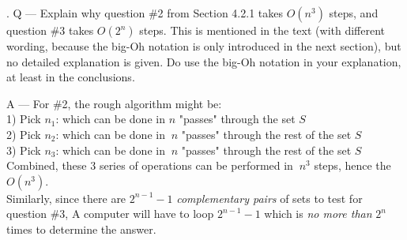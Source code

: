 \documentclass{article}
\newcounter{question}
\begin{document}
\newcommand\Que[1]{%
   \leavevmode\par
   \stepcounter{question}
   \noindent
   \thequestion. Q --- #1\par}

\newcommand\Ans[2][]{%
    \leavevmode\par\noindent
   {\leftskip37pt
    A --- \textbf{#1}#2\par}}

\Que{
    Explain why question \#2 from Section 4.2.1 takes $O(n^3)$ steps, 
    and question \#3 takes $O(2^n)$ steps. This is mentioned in the text 
    (with different wording, because the big-Oh notation is only introduced 
    in the next section), but no detailed explanation is given. 
    Do use the big-Oh notation in your explanation, at least in the conclusions.
    }
\Ans{
    For \#2, the rough algorithm might be:\\

    1) Pick $n_1$: which can be done in $n$ "passes" through the set $S$\\

    2) Pick $n_2$: which can be done in $~n$ "passes" through the rest of the set $S$\\

    3) Pick $n_3$: which can be done in $~n$ "passes" through the rest of the set $S$\\

    Combined, these 3 series of operations can be performed in $~n^3$ steps, hence the $O(n^3)$.\\

    Similarly, since there are $2^{n-1}-1$ \textit{complementary pairs} of sets to test for question \#3,
    A computer will have to loop $2^{n-1}-1$ which is \textit{no more than} $2^n$ times to determine the answer.\\
    }
\end{document}
